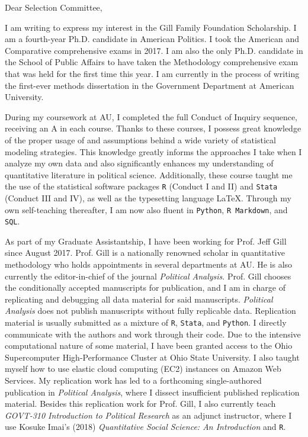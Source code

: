 \documentclass[10pt,letterpaper,dateno,sigleft]{newlfm}
\begin{document}
\begin{newlfm}


\vspace{-0.3cm}

Dear Selection Committee,

\vspace{0.15cm}

I am writing to express my interest in the Gill Family Foundation Scholarship. I am a fourth-year Ph.D. candidate in American Politics. I took the American and Comparative comprehensive exams in 2017. I am also the only Ph.D. candidate in the School of Public Affairs to have taken the Methodology comprehensive exam that was held for the first time this year. I am currently in the process of writing the first-ever methods dissertation in the Government Department at American University. 

During my coursework at AU, I completed the full Conduct of Inquiry sequence, receiving an A in each course. Thanks to these courses, I possess great knowledge of the proper usage of and assumptions behind a wide variety of statistical modeling strategies. This knowledge greatly informs the approaches I take when I analyze my own data and also significantly enhances my understanding of quantitative literature in political science. Additionally, these course taught me the use of the statistical software packages {\tt R} (Conduct I and II) and {\tt Stata} (Conduct III and IV), as well as the typesetting language {\lsstyle \LaTeX}. Through my own self-teaching thereafter, I am now also fluent in {\tt Python}, {\tt R Markdown}, and {\tt SQL}.

As part of my Graduate Assistantship, I have been working for Prof. Jeff Gill since August 2017. Prof. Gill is a nationally renowned scholar in quantitative methodology who holds appointments in several departments at AU. He is also currently the editor-in-chief of the journal \textit{Political Analysis}. Prof. Gill chooses the conditionally accepted manuscripts for publication, and I am in charge of replicating and debugging all data material for said manuscripts. \textit{Political Analysis} does not publish manuscripts without fully replicable data. Replication material is usually submitted as a mixture of {\tt R}, {\tt Stata}, and {\tt Python}. I directly communicate with the authors and work through their code. Due to the intensive computational nature of some material, I have been granted access to the Ohio Supercomputer High-Performance Cluster at Ohio State University. I also taught myself how to use elastic cloud computing (EC2) instances on Amazon Web Services. My replication work has led to a forthcoming single-authored publication in \textit{Political Analysis}, where I dissect insufficient published replication material. Besides this replication work for Prof. Gill, I also currently teach \textit{GOVT-310 Introduction to Political Research} as an adjunct instructor, where I use Kosuke Imai's (2018) \textit{Quantitative Social Science: An Introduction} and {\tt R}.



\end{newlfm}
\end{document}
